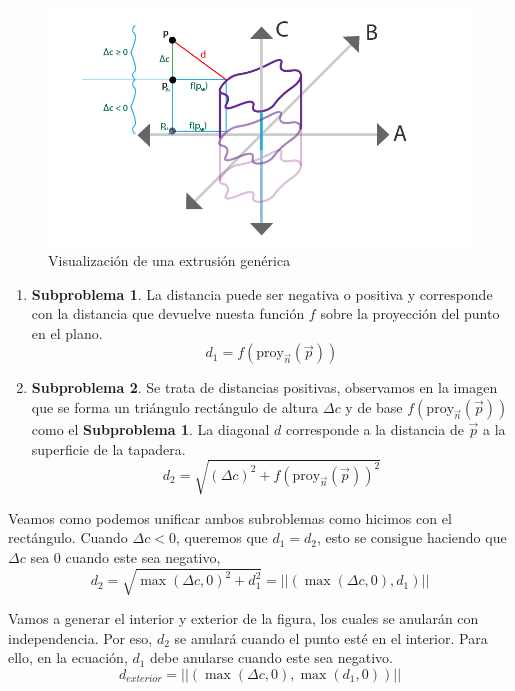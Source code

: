 \begin{figure}[H]
  \centering
  \captionsetup{justification=centering}%
  \includegraphics[width=1.0\textwidth]{secciones/imagenes/sdf/proofs/proof_extrussion.png}
  \caption{Visualización de una extrusión genérica}
  \label{fig:proof_extrussion}
\end{figure}

\begin{enumerate}
    \item \textbf{Subproblema 1}. La distancia puede ser negativa o positiva y corresponde con la distancia que devuelve nuesta función \(f\) sobre la proyección del punto en el plano.
    \[d_1=f(\text{proy}_{\Vec{n}}(\Vec{p}))\]
    \item \textbf{Subproblema 2}. Se trata de distancias positivas, observamos en la imagen que se forma un triángulo rectángulo de altura \(\Delta c\) y de base \(f(\text{proy}_{\Vec{n}}(\Vec{p}))\) como el \textbf{Subproblema 1}. La diagonal \(d\) corresponde a la distancia de \(\Vec{p}\) a la superficie de la tapadera.
    \[d_2=\sqrt{(\Delta c)^2+f(\text{proy}_{\Vec{n}}(\Vec{p}))^2}\]
\end{enumerate}

Veamos como podemos unificar ambos subroblemas como hicimos con el rectángulo. Cuando \(\Delta c < 0\), queremos que \(d_1=d_2\), esto se consigue haciendo que \(\Delta c\) sea 0 cuando este sea negativo,
\[d_2=\sqrt{\max(\Delta c, 0)^2+d_1^2}=\vert\vert (\max(\Delta c, 0), d_1)\vert\vert\]

Vamos a generar el interior y exterior de la figura, los cuales se anularán con independencia. Por eso, \(d_2\) se anulará cuando el punto esté en el interior. Para ello, en la ecuación, \(d_1\) debe anularse cuando este sea negativo.
\[d_{exterior}=\vert\vert (\max(\Delta c,0), \max(d_1, 0))\vert\vert\]


